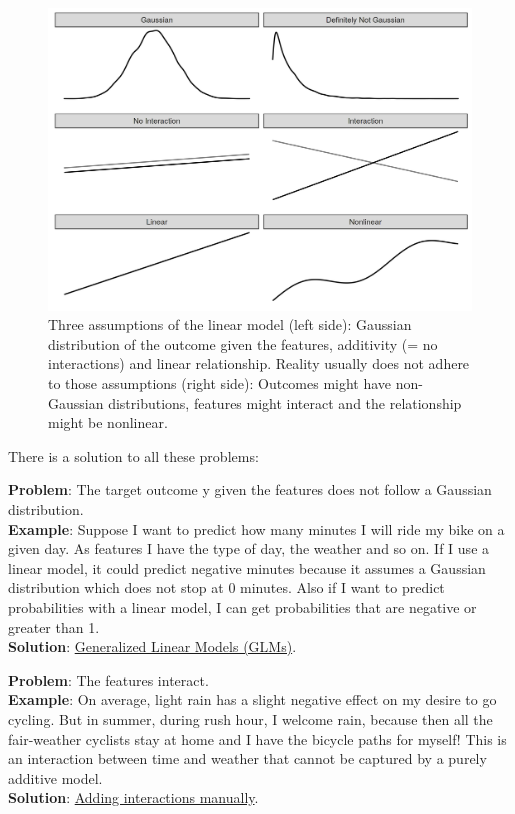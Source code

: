 \documentclass[12pt,]{krantz}
\begin{document}
\begin{figure}

{\centering \includegraphics[width=\textwidth]{images/three-lm-problems-1} 

}

\caption{Three assumptions of the linear model (left side): Gaussian distribution of the outcome given the features, additivity (= no interactions) and linear relationship. Reality usually does not adhere to those assumptions (right side): Outcomes might have non-Gaussian distributions, features might interact and the relationship might be nonlinear.}\label{fig:three-lm-problems}
\end{figure}

There is a solution to all these problems:

\textbf{Problem}: The target outcome y given the features does not
follow a Gaussian distribution.\\
\textbf{Example}: Suppose I want to predict how many minutes I will ride
my bike on a given day. As features I have the type of day, the weather
and so on. If I use a linear model, it could predict negative minutes
because it assumes a Gaussian distribution which does not stop at 0
minutes. Also if I want to predict probabilities with a linear model, I
can get probabilities that are negative or greater than 1.\\
\textbf{Solution}: \protect\hyperlink{glm}{Generalized Linear Models
(GLMs)}.

\textbf{Problem}: The features interact.\\
\textbf{Example}: On average, light rain has a slight negative effect on
my desire to go cycling. But in summer, during rush hour, I welcome
rain, because then all the fair-weather cyclists stay at home and I have
the bicycle paths for myself! This is an interaction between time and
weather that cannot be captured by a purely additive model.\\
\textbf{Solution}: \protect\hyperlink{lm-interact}{Adding interactions
manually}.
\end{document}

